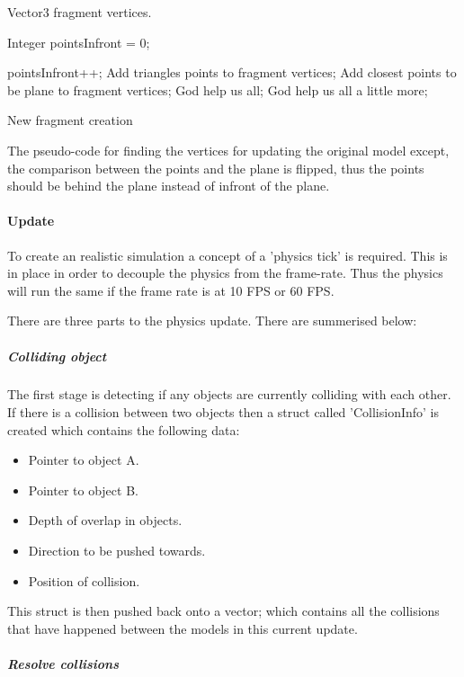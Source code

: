 \documentclass[conference,backref=page]{acmsiggraph}
\begin{document}
\begin{algorithm}
Vector3 fragment vertices.  \hfill

{
		Integer pointsInfront = 0; \hfill 
		
		{
			{
				pointsInfront++;
			}
		}
	{
		Add triangles points to fragment vertices;
	}
	{
		Add closest points to be plane to fragment vertices;
	}
	{
		God help us all;
	}
	{
		God help us all a little more;
	}
}
 \caption{New fragment creation}
\end{algorithm}

 The pseudo-code for finding the vertices for updating the original model except, the comparison between the points and the plane is flipped, thus the points should be behind the plane instead of infront of the plane.




\paragraph{Update} \hfill

To create an realistic simulation a concept of a 'physics tick' is required. This is in place in order to decouple the physics from the frame-rate. Thus the physics will run the same if the frame rate is at 10 FPS or 60 FPS.  

There are three parts to the physics update. There are summerised below:

\subparagraph{Colliding object}
The first stage is detecting if any objects are currently colliding with each other.
If there is a collision between two objects then a struct called 'CollisionInfo' is created which contains the following data:

\begin{itemize}
\item{Pointer to object A.}
\item{Pointer to object B.}
\item{Depth of overlap in objects.}
\item{Direction to be pushed towards.}
\item{Position of collision.}
\end{itemize}

This struct is then pushed back onto a vector; which contains all the collisions that have happened between the models in this current update.
\subparagraph{Resolve collisions}\hfill
\end{document}

